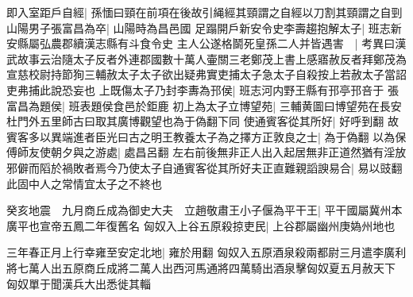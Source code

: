 即入室距戶自經|{
	孫愐曰頸在前項在後故引䋲經其頸謂之自經以刀割其頸謂之自剄}
山陽男子張富昌為卒|{
	山陽時為昌邑國}
足蹋開戶新安令史李壽趨抱解太子|{
	班志新安縣屬弘農郡續漢志縣有斗食令史}
主人公遂格鬬死皇孫二人并皆遇害　|{
	考異曰漢武故事云治隨太子反者外連郡國數十萬人壷關三老鄭茂上書上感寤赦反者拜鄭茂為宣慈校尉持節狥三輔赦太子太子欲出疑弗實吏捕太子急太子自殺按上若赦太子當詔吏弗捕此說恐妄也}
上既傷太子乃封李夀為邘侯|{
	班志河内野王縣有邘亭邘咅于}
張富昌為題侯|{
	班表題侯食邑於鉅鹿}
初上為太子立博望苑|{
	三輔黄圖曰博望苑在長安杜門外五里師古曰取其廣博觀望也為于偽翻下同}
使通賓客從其所好|{
	好呼到翻}
故賓客多以異端進者臣光曰古之明王教養太子為之擇方正敦良之士|{
	為于偽翻}
以為保傅師友使朝夕與之游處|{
	處昌呂翻}
左右前後無非正人出入起居無非正道然猶有淫放邪僻而䧟於禍敗者焉今乃使太子自通賓客從其所好夫正直難親謟諛易合|{
	易以豉翻}
此固中人之常情宜太子之不終也

癸亥地震　九月商丘成為御史大夫　立趙敬肅王小子偃為平干王|{
	平干國屬冀州本廣平也宣帝五鳳二年復舊名}
匈奴入上谷五原殺掠吏民|{
	上谷郡屬幽州庚媯州地也}


三年春正月上行幸雍至安定北地|{
	雍於用翻}
匈奴入五原酒泉殺兩都尉三月遣李廣利將七萬人出五原商丘成將二萬人出西河馬通將四萬騎出酒泉擊匈奴夏五月赦天下　匈奴單于聞漢兵大出悉徙其輜

